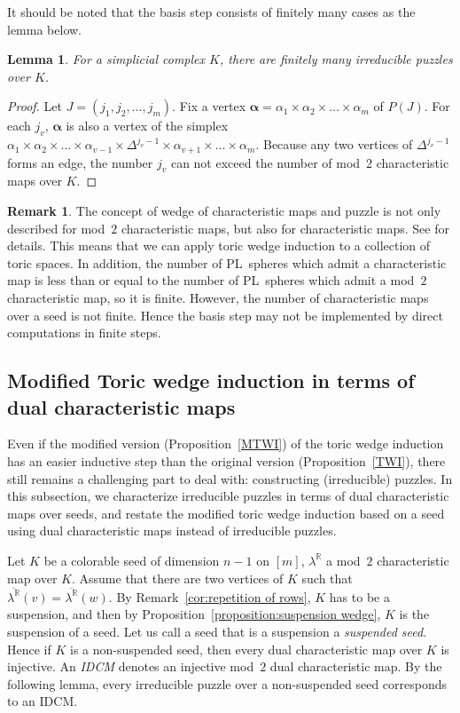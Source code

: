 \documentclass[11pt]{amsart}
\theoremstyle{plain}
\newtheorem{lemma}[theorem]{Lemma}
\numberwithin{equation}{section}
\theoremstyle{definition}
\newtheorem{remark}[theorem]{Remark}
\newcommand{\R}{\mathbb{R}}
\begin{document}
It should be noted that the basis step consists of finitely many cases as the lemma below.

\begin{lemma} \label{lemma:finite irreducible}
    For a simplicial complex $K$, there are finitely many irreducible puzzles over $K$.
\end{lemma}

\begin{proof}
    Let $J=(j_1, j_2, \ldots, j_m)$.
    Fix a vertex $\bm{\alpha}=\alpha_1 \times \alpha_2 \times \dots \times \alpha_m$ of $P(J)$.
    For each $j_v$, $\bm{\alpha}$ is also a vertex of the simplex $\alpha_1 \times \alpha_2 \times \dots \times \alpha_{v-1} \times \Delta^{j_v-1} \times \alpha_{v+1} \times \dots \times \alpha_m$.
    Because any two vertices of $\Delta^{j_v-1}$ forms an edge, the number $j_v$ can not exceed the number of mod~$2$ characteristic maps over $K$.
\end{proof}

\begin{remark}
    The concept of wedge of characteristic maps and puzzle is not only described for mod~$2$ characteristic maps, but also for characteristic maps. See \cite{CP_wedge_2} for details.
    This means that we can apply toric wedge induction to a collection of toric spaces.
    In addition, the number of PL~spheres which admit a characteristic map is less than or equal to the number of PL~spheres which admit a mod~$2$ characteristic map, so it is finite.
    However, the number of characteristic maps over a seed is not finite.
    Hence the basis step may not be implemented by direct computations in finite steps.
\end{remark}



\subsection{Modified Toric wedge induction in terms of dual characteristic maps}
Even if the modified version (Proposition~\ref{MTWI}) of the toric wedge induction has an easier inductive step than the original version (Proposition~\ref{TWI}), there still remains a challenging part to deal with: constructing (irreducible) puzzles.
In this subsection, we characterize irreducible puzzles in terms of dual characteristic maps over seeds, and restate the modified toric wedge induction based on a seed using dual characteristic maps instead of irreducible puzzles.

Let $K$ be a colorable seed of dimension $n-1$ on $[m]$, $\lambda^\R$ a mod~$2$ characteristic map over $K$.
Assume that there are two vertices of $K$ such that $\overline{\lambda^\R}(v) = \overline{\lambda^\R}(w)$.
By Remark~\ref{cor:repetition of rows}, $K$ has to be a suspension, and then by Proposition~\ref{proposition:suspension wedge}, $K$ is the suspension of a seed.
Let us call a seed that is a suspension a \emph{suspended seed}.
Hence if $K$ is a non-suspended seed, then every dual characteristic map over $K$ is injective.
An \emph{IDCM} denotes an injective mod~$2$ dual characteristic map.
By the following lemma, every irreducible puzzle over a non-suspended seed corresponds to an IDCM.
\end{document}
